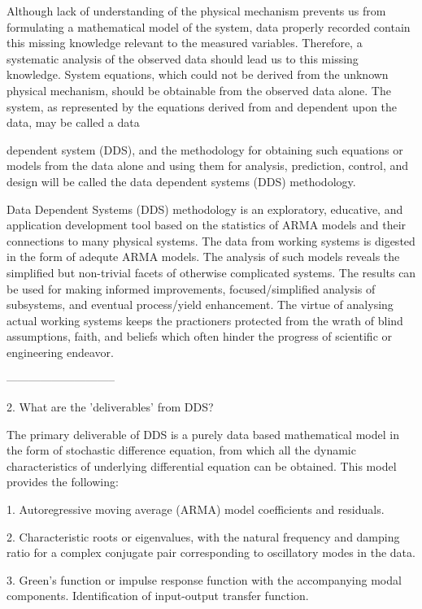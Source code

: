 Although lack of understanding of the physical
mechanism prevents us from formulating a
mathematical model of the system, data properly
recorded contain this missing knowledge relevant
to the measured variables.  Therefore, a
systematic analysis of the observed data should
lead us to this missing knowledge.  System
equations, which could not be derived from the
unknown physical mechanism, should be obtainable
from the observed data alone.  The system, as
represented by the equations derived from and
dependent upon the data, may be called a data
 
dependent system (DDS), and the methodology for
obtaining such equations or models from the data
alone and using them for analysis, prediction,
control, and design will be called the data
dependent systems (DDS) methodology.
 
Data Dependent Systems (DDS) methodology is an
exploratory, educative, and application
development tool based on the statistics of ARMA
models and their connections to many physical
systems.  The data from working systems is
digested in the form of adequte ARMA models.  The
analysis of such models reveals the simplified but
non-trivial facets of otherwise complicated
systems.  The results can be used for making
informed improvements, focused/simplified analysis
of subsystems, and eventual process/yield
enhancement.  The virtue of analysing actual
working systems keeps the practioners protected
from the wrath of blind assumptions, faith, and
beliefs which often hinder the progress of
scientific or engineering endeavor.
 
-----------------------------
 
2. What are the 'deliverables' from DDS?
 
The primary deliverable of DDS is a purely data
based mathematical model in the form of stochastic
difference equation, from which all the dynamic
characteristics of underlying differential
equation can be obtained.  This model provides the
following:
 
    1. Autoregressive moving average
       (ARMA) model coefficients and residuals.
 
    2. Characteristic roots or eigenvalues, with the
       natural frequency and damping ratio for a complex
       conjugate pair corresponding to oscillatory modes
       in the data.
 
    3. Green's function or impulse response
       function with the accompanying modal components.
       Identification of input-output transfer function.
 
